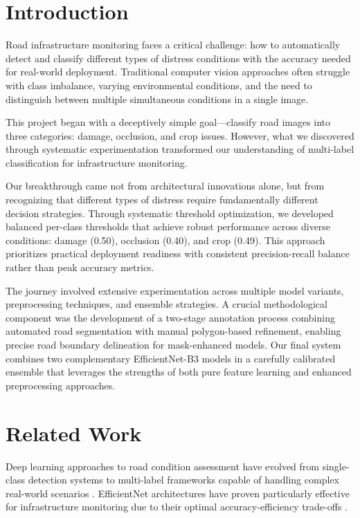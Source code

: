 \documentclass[12pt,twocolumn]{article}
\begin{document}
\section{Introduction}

Road infrastructure monitoring faces a critical challenge: how to automatically detect and classify different types of distress conditions with the accuracy needed for real-world deployment. Traditional computer vision approaches often struggle with class imbalance, varying environmental conditions, and the need to distinguish between multiple simultaneous conditions in a single image.

This project began with a deceptively simple goal—classify road images into three categories: damage, occlusion, and crop issues. However, what we discovered through systematic experimentation transformed our understanding of multi-label classification for infrastructure monitoring.

Our breakthrough came not from architectural innovations alone, but from recognizing that different types of distress require fundamentally different decision strategies. Through systematic threshold optimization, we developed balanced per-class thresholds that achieve robust performance across diverse conditions: damage (0.50), occlusion (0.40), and crop (0.49). This approach prioritizes practical deployment readiness with consistent precision-recall balance rather than peak accuracy metrics.

The journey involved extensive experimentation across multiple model variants, preprocessing techniques, and ensemble strategies. A crucial methodological component was the development of a two-stage annotation process combining automated road segmentation with manual polygon-based refinement, enabling precise road boundary delineation for mask-enhanced models. Our final system combines two complementary EfficientNet-B3 models in a carefully calibrated ensemble that leverages the strengths of both pure feature learning and enhanced preprocessing approaches.

\section{Related Work}

Deep learning approaches to road condition assessment have evolved from single-class detection systems to multi-label frameworks capable of handling complex real-world scenarios \citet{he2016deep}. EfficientNet architectures have proven particularly effective for infrastructure monitoring due to their optimal accuracy-efficiency trade-offs \citet{krizhevsky2012imagenet}.
\end{document}
